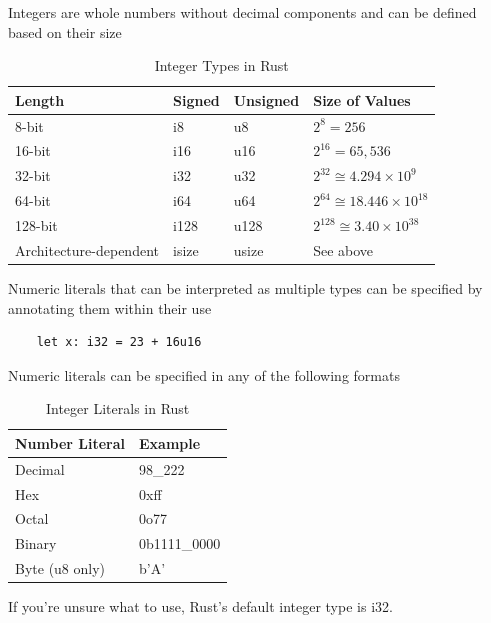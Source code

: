 \documentclass[]{article}
\begin{document}
Integers are whole numbers without decimal components and can be defined based on their size
\begin{table}[h]
    \centering
    \caption{Integer Types in Rust}
    \label{tab:int-types}
    \begin{tabular}{@{}llll@{}}
        \toprule
        Length                 & Signed & Unsigned & Size of Values                  \\ \midrule
        8-bit                  & i8     & u8       & $2^8=256$                        \\
        16-bit                 & i16    & u16      & $2^{16}=65,536$                  \\
        32-bit                 & i32    & u32      & $2^{32}\cong4.294\times10^9$   \\
        64-bit                 & i64    & u64      & $2^{64}\cong18.446\times10^{18}$ \\
        128-bit                & i128   & u128     & $2^{128}\cong3.40\times10^{38}$  \\
        Architecture-dependent & isize  & usize    & See above                        \\ \bottomrule
    \end{tabular}
\end{table}
Numeric literals that can be interpreted as multiple types can be specified by annotating them within their use
\begin{verbatim}
    let x: i32 = 23 + 16u16
\end{verbatim}
Numeric literals can be specified in any of the following formats
\begin{table}[h]
    \centering
    \caption{Integer Literals in Rust}
    \label{tab:my-table}
    \begin{tabular}{@{}ll@{}}
        \toprule
        Number Literal & Example      \\ \midrule
        Decimal        & 98\_222      \\
        Hex            & 0xff         \\
        Octal          & 0o77         \\
        Binary         & 0b1111\_0000 \\
        Byte (u8 only) & b'A'         \\ \bottomrule
    \end{tabular}
\end{table}
If you're unsure what to use, Rust's default integer type is i32.
\end{document}
